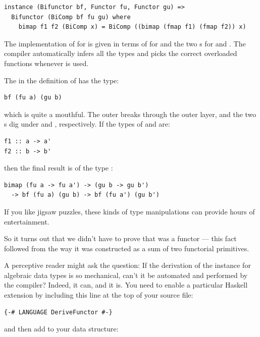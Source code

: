 \begin{verbatim}
instance (Bifunctor bf, Functor fu, Functor gu) =>
  Bifunctor (BiComp bf fu gu) where
    bimap f1 f2 (BiComp x) = BiComp ((bimap (fmap f1) (fmap f2)) x) 
\end{verbatim}
The implementation of  for  is given in
terms of  for  and the two s for
 and . The compiler automatically infers all the
types and picks the correct overloaded functions whenever
 is used.

The  in the definition of  has the type:

\begin{Verbatim}[commandchars=\\\{\}]
bf (fu a) (gu b)
\end{Verbatim}
which is quite a mouthful. The outer  breaks through the
outer  layer, and the two s dig under
 and , respectively. If the types of 
and  are:

\begin{Verbatim}[commandchars=\\\{\}]
f1 :: a -> a'
f2 :: b -> b'
\end{Verbatim}
then the final result is of the type
:

\begin{Verbatim}[commandchars=\\\{\}]
bimap (fu a -> fu a') -> (gu b -> gu b')
  -> bf (fu a) (gu b) -> bf (fu a') (gu b')
\end{Verbatim}
If you like jigsaw puzzles, these kinds of type manipulations can
provide hours of entertainment.

So it turns out that we didn't have to prove that  was a
functor --- this fact followed from the way it was constructed as a sum
of two functorial primitives.

A perceptive reader might ask the question: If the derivation of the
 instance for algebraic data types is so mechanical,
can't it be automated and performed by the compiler? Indeed, it can, and
it is. You need to enable a particular Haskell extension by including
this line at the top of your source file:

\begin{verbatim}
{-# LANGUAGE DeriveFunctor #-}
\end{verbatim}
and then add  to your data structure:

